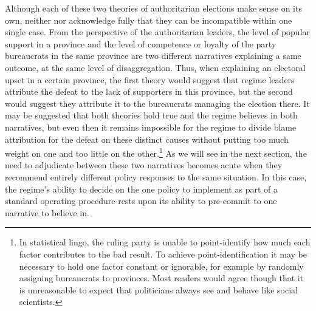 \documentclass[12pt]{article}\usepackage[]{graphicx}\usepackage[]{color}
\newcommand{\1}{\mathbbm{1}}
\begin{document}
Although each of these two theories of authoritarian elections make sense on its own, neither \cite{Magaloni2006} nor \cite{Blaydes2008} acknowledge fully that they can be incompatible within one single case. From the perspective of the authoritarian leaders, the level of popular support in a province and the level of competence or loyalty of the party bureaucrats in the same province are two different narratives explaining a same outcome, at the same level of disaggregation. Thus, when explaining an electoral upset in a certain province, the first theory would suggest that regime leaders attribute the defeat to the lack of supporters in this province, but the second would suggest they attribute it to the bureaucrats managing the election there. It may be suggested that both theories hold true and the regime believes in both narratives, but even then it remains impossible for the regime to divide blame attribution for the defeat on these distinct causes without putting too much weight on one and too little on the other.\footnote{In statistical lingo, the ruling party is unable to point-identify how much each factor contributes to the bad result. To achieve point-identification it may be necessary to hold one factor constant or ignorable, for example by randomly assigning bureaucrats to provinces. Most readers would agree though that it is unreasonable to expect that politicians always see and behave like social scientists.} As we will see in the next section, the need to adjudicate between these two narratives becomes acute when they recommend entirely different policy responses to the same situation. In this case, the regime's ability to decide on the one policy to implement as part of a standard operating procedure rests upon its ability to pre-commit to one narrative to believe in.


\end{document}

